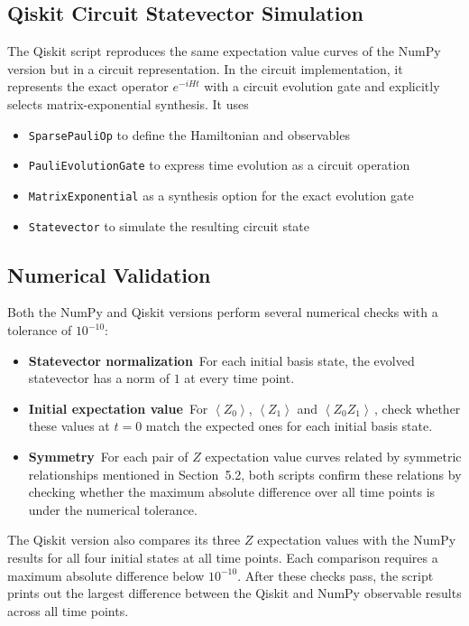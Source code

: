\documentclass[11pt]{article}
\numberwithin{equation}{section}
\newcommand{\ev}[1]{\left\langle #1 \right\rangle} %
\begin{document}
\subsection{Qiskit Circuit Statevector Simulation}
The Qiskit script reproduces the same expectation value curves of the NumPy version but in a circuit representation. In the circuit implementation, it represents the exact operator $e^{-iHt}$ with a circuit evolution gate and explicitly selects matrix-exponential synthesis. It uses
\begin{itemize}
  \item \texttt{SparsePauliOp} to define the Hamiltonian and observables
  \item \texttt{PauliEvolutionGate} to express time evolution as a circuit operation
  \item \texttt{MatrixExponential} as a synthesis option for the exact evolution gate
  \item \texttt{Statevector} to simulate the resulting circuit state
\end{itemize}


\subsection{Numerical Validation}
Both the NumPy and Qiskit versions perform several numerical checks with a tolerance of $10^{-10}$:
\begin{itemize}
    \item \textbf{Statevector normalization}\,  For each initial basis state, the evolved statevector has a norm of $1$ at every time point.
    \item \textbf{Initial expectation value}\, For $\ev{Z_0}$, $\ev{Z_1}$ and $\ev{Z_0Z_1}$\,, check whether these values at $t = 0$ match the expected ones for each initial basis state.
    \item \textbf{Symmetry}\, For each pair of $Z$ expectation value curves related by symmetric relationships mentioned in Section~5.2, both scripts confirm these relations by checking whether the maximum absolute difference over all time points is under the numerical tolerance.
\end{itemize}

The Qiskit version also compares its three $Z$ expectation values with the NumPy results for all four initial states at all time points. Each comparison requires a maximum absolute difference below $10^{-10}$. After these checks pass, the script prints out the largest difference between the Qiskit and NumPy observable results across all time points.
\end{document}
